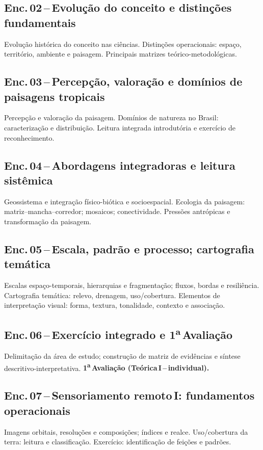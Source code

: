 \documentclass[11pt,a4paper]{article}
\begin{document}
\subsection*{Enc.\,02\,--\,Evolução do conceito e distinções fundamentais}
Evolução histórica do conceito nas ciências. Distinções operacionais: espaço, território, ambiente e paisagem. Principais matrizes teórico-metodológicas.

\subsection*{Enc.\,03\,--\,Percepção, valoração e domínios de paisagens tropicais}
Percepção e valoração da paisagem. Domínios de natureza no Brasil: caracterização e distribuição. Leitura integrada introdutória e exercício de reconhecimento.

\subsection*{Enc.\,04\,--\,Abordagens integradoras e leitura sistêmica}
Geossistema e integração físico-biótica e socioespacial. Ecologia da paisagem: matriz--mancha--corredor; mosaicos; conectividade. Pressões antrópicas e transformação da paisagem.

\subsection*{Enc.\,05\,--\,Escala, padrão e processo; cartografia temática}
Escalas espaço-temporais, hierarquias e fragmentação; fluxos, bordas e resiliência. Cartografia temática: relevo, drenagem, uso/cobertura. Elementos de interpretação visual: forma, textura, tonalidade, contexto e associação.

\subsection*{Enc.\,06\,--\,Exercício integrado e 1\textsuperscript{a}\,Avaliação}
Delimitação da área de estudo; construção de matriz de evidências e síntese descritivo-interpretativa. \textbf{1\textsuperscript{a}\,Avaliação (Teórica\,I\,--\,individual).}

\subsection*{Enc.\,07\,--\,Sensoriamento remoto\,I: fundamentos operacionais}
Imagens orbitais, resoluções e composições; índices e realce. Uso/cobertura da terra: leitura e classificação. Exercício: identificação de feições e padrões.
\end{document}
